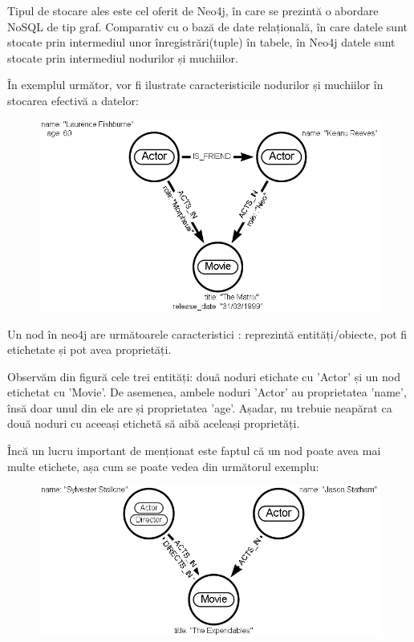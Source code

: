\documentclass[12pt,a4paper]{report}
\begin{document}
Tipul de stocare ales este cel oferit de Neo4j, în care se prezintă o abordare NoSQL de tip graf.  Comparativ cu o bază de date relațională, în care datele sunt stocate prin intermediul unor înregistrări(tuple) în tabele, în Neo4j datele sunt stocate prin intermediul nodurilor și muchiilor.

În exemplul următor, vor fi ilustrate caracteristicile nodurilor și muchiilor în stocarea efectivă a datelor:


\begin{figure}[H]
\centering
\caption{}
\includegraphics[scale=0.5]{exemplu_1_neo4j}
\caption*{}
\end{figure}


Un nod în neo4j are următoarele caracteristici \cite{6}: reprezintă entități/obiecte, pot fi etichetate și pot avea proprietăți.

Observăm din figură cele trei entități: două noduri etichate cu 'Actor' și un nod etichetat cu 'Movie'. De asemenea, ambele noduri 'Actor' au proprietatea 'name', însă doar unul din ele are și proprietatea 'age'. Așadar, nu trebuie neapărat ca două noduri cu aceeași etichetă să aibă aceleași proprietăți.

Încă un lucru important de menționat este faptul că un nod poate avea mai multe etichete, așa cum se poate vedea din următorul exemplu:


\begin{figure}[H]
\centering
\caption{}
\includegraphics[scale=0.5]{exemplu_2_neo4j}
\caption*{}
\end{figure}
\end{document}
